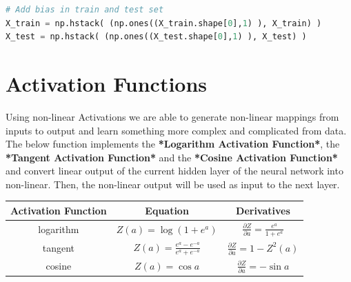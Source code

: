 \documentclass[11pt]{article}
\begin{document}
\begin{lstlisting}[language = Python]
# Add bias in train and test set
X_train = np.hstack( (np.ones((X_train.shape[0],1) ), X_train) )
X_test = np.hstack( (np.ones((X_test.shape[0],1) ), X_test) )
\end{lstlisting}
\newpage

\section{Activation Functions}
 Using non-linear Activations we are able to generate non-linear mappings from inputs to output and learn something more complex and complicated from data. The below function implements the \textbf{*Logarithm Activation Function*}, the \textbf{*Tangent Activation Function*} and the \textbf{*Cosine Activation Function*} and convert linear output of the current hidden layer of the neural network into non-linear. Then, the non-linear output will be used as input to the next layer. \\
\begin{center}
 \begin{tabular}{||c c c||} 
 
 \hline
Activation Function & Equation & Derivatives \\ [1ex] 
 \hline\hline
 
logarithm & $Z(a) = \log (1 + e^{a}) $ & $ \frac{\partial Z}{\partial a} = \frac{e^{a}}{1 + e^{a}} $ \\ [1ex]
 \hline 
 tangent & $Z(a) = \frac{e^a - e^{-a}}{e^a + e^{-a}}$ & $\frac{\partial Z}{\partial a} = 1 - Z^2(a)$ \\ [1ex]
 \hline
 cosine & $Z(a) = \cos a $ & $ \frac{\partial Z}{\partial a} = -\sin a$ \\ [1ex]
 \hline
\end{tabular}
\end{center}
\hfill
\newline
\end{document}
